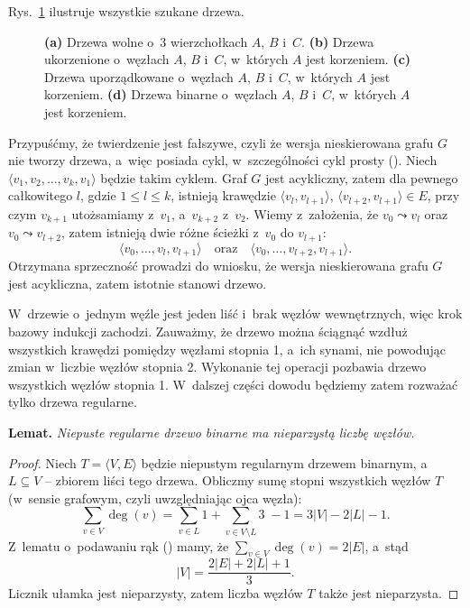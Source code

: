 
\exercise %
Rys.\ \ref{fig:B.5-1} ilustruje wszystkie szukane drzewa.
\begin{figure}[!ht]
	\centering 
	\caption{{\sffamily\bfseries(a)} Drzewa wolne o~3 wierzchołkach $A$, $B$ i~$C$.
{\sffamily\bfseries(b)} Drzewa ukorzenione o~węzłach $A$, $B$ i~$C$, w~których $A$ jest korzeniem.
{\sffamily\bfseries(c)} Drzewa uporządkowane o~węzłach $A$, $B$ i~$C$, w~których $A$ jest korzeniem.
{\sffamily\bfseries(d)} Drzewa binarne o~węzłach $A$, $B$ i~$C$, w~których $A$ jest korzeniem.} \label{fig:B.5-1}
\end{figure}

\exercise %
Przypuśćmy, że twierdzenie jest fałszywe, czyli że wersja nieskierowana grafu $G$ nie tworzy drzewa, a~więc posiada cykl, w~szczególności cykl prosty ().
Niech $\langle v_1,v_2,\dots,v_k,v_1\rangle$ będzie takim cyklem.
Graf $G$ jest acykliczny, zatem dla pewnego całkowitego $l$, gdzie $1\le l\le k$, istnieją krawędzie $\langle v_l,v_{l+1}\rangle$, $\langle v_{l+2},v_{l+1}\rangle\in E$, przy czym $v_{k+1}$ utożsamiamy z~$v_1$, a~$v_{k+2}$ z~$v_2$.
Wiemy z~założenia, że $v_0\leadsto v_l$ oraz $v_0\leadsto v_{l+2}$, zatem istnieją dwie różne ścieżki z~$v_0$ do $v_{l+1}$:
\[
	\langle v_0,\dots,v_l,v_{l+1}\rangle \quad\text{oraz}\quad \langle v_0,\dots,v_{l+2},v_{l+1}\rangle.
\]
Otrzymana sprzeczność prowadzi do wniosku, że wersja nieskierowana grafu $G$ jest acykliczna, zatem istotnie stanowi drzewo.

\exercise %
W~drzewie o~jednym węźle jest jeden liść i~brak węzłów wewnętrznych, więc krok bazowy indukcji zachodzi.
Zauważmy, że drzewo można ściągnąć wzdłuż wszystkich krawędzi pomiędzy węzłami stopnia 1, a~ich synami, nie powodując zmian w~liczbie węzłów stopnia 2.
Wykonanie tej operacji pozbawia drzewo wszystkich węzłów stopnia 1.
W~dalszej części dowodu będziemy zatem rozważać tylko drzewa regularne.

\medskip
\noindent\textsf{\textbf{Lemat.}} \textit{Niepuste regularne drzewo binarne ma nieparzystą liczbę węzłów.}
\begin{proof}
Niech $T=\langle V,E\rangle$ będzie niepustym regularnym drzewem binarnym, a~$L\subseteq V$ -- zbiorem liści tego drzewa.
Obliczmy sumę stopni wszystkich węzłów $T$ (w~sensie grafowym, czyli uwzględniając ojca węzła):
\[
	\sum_{v\in V}\deg(v) = \sum_{v\in L}1+\sum_{v\in V\setminus L}\!\!\!3\;-1=3|V|-2|L|-1.
\]
Z~lematu o~podawaniu rąk () mamy, że $\sum_{v\in V}\deg(v) = 2|E|$, a~stąd
\[
	|V| = \frac{2|E|+2|L|+1}{3}.
\]
Licznik ułamka jest nieparzysty, zatem liczba węzłów $T$ także jest nieparzysta.
\end{proof}

